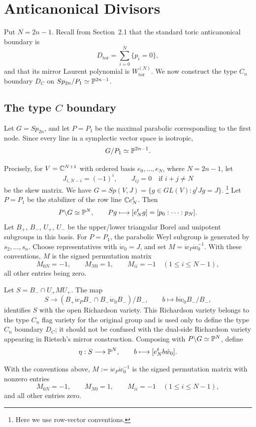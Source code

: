\section{Anticanonical Divisors}
Put \(N=2n-1\). Recall from Section~2.1 that the standard toric anticanonical boundary is
\[
D_{\mathrm{tor}}=\sum_{i=0}^{N}\{p_i=0\},
\]
and that its mirror Laurent polynomial is \(W_{\mathrm{tor}}^{(N)}\). We now construct the type \(C_n\) boundary \(D_C\) on \(Sp_{2n}/P_1\simeq\mathbb{P}^{2n-1}\).

\subsection{The type \(C\) boundary}
Let \(G=Sp_{2n}\), and let \(P=P_1\) be the maximal parabolic corresponding to the first node. Since every line in a symplectic vector space is isotropic,
\[
G/P_1\simeq\mathbb{P}^{2n-1}.
\]

Precisely, for \(V=\mathbb{C}^{N+1}\) with ordered basis \(e_0,\ldots,e_N\), where \(N=2n-1\), let
\[
J_{i,N-i}=(-1)^i,
\qquad
J_{ij}=0\quad\text{if }i+j\ne N
\]
be the skew matrix.
We have \(G=Sp(V,J)=\{g\in GL(V):g^tJg=J\}\). \footnote{Here we use row-vector conventions.} Let \(P=P_1\) be the stabilizer of the row line \(\mathbb{C} e_N^t\). Then
\[
P\backslash G\simeq \mathbb{P}^N,
\qquad
Pg\longmapsto [e_N^tg]=[p_0:\cdots:p_N].
\]
Let \(B_+\), \(B_-\), \(U_+\), \(U_-\) be the upper/lower triangular Borel and unipotent subgroups in this basis. For \(P=P_1\), the parabolic Weyl subgroup is generated by \(s_2,\ldots,s_n\). Choose representatives with \(\dot w_0=J\), and set \(M=\dot w_P\dot w_0^{-1}\). With these conventions, \(M\) is the signed permutation matrix
\[
M_{0N}=-1,
\qquad
M_{N0}=1,
\qquad
M_{ii}=-1\quad(1\le i\le N-1),
\]
all other entries being zero.

Let \(S=B_-\cap U_+MU_+\). The map
\[
S\longrightarrow (B_+\dot w_PB_-\cap B_-\dot w_0B_-)/B_-,
\qquad
b\longmapsto b\dot w_0B_-/B_-,
\]
identifies \(S\) with the open Richardson variety. This Richardson variety belongs to the type \(C_n\) flag variety for the original group and is used only to define the type \(C_n\) boundary \(D_C\); it should not be confused with the dual-side Richardson variety appearing in Rietsch's mirror construction.
Composing with \(P\backslash G\simeq\mathbb{P}^N\), define
\[
\eta:S\longrightarrow \mathbb{P}^N,
\qquad
b\longmapsto [e_N^tb\dot w_0].
\]

\begin{prop}\label{prop:M-matrix}
With the conventions above, \(M:=\dot w_P\dot w_0^{-1}\) is the signed permutation matrix with nonzero entries
\[
M_{0N}=-1,\qquad
M_{N0}=1,\qquad
M_{ii}=-1\quad(1\le i\le N-1),
\]
and all other entries zero.
\end{prop}

